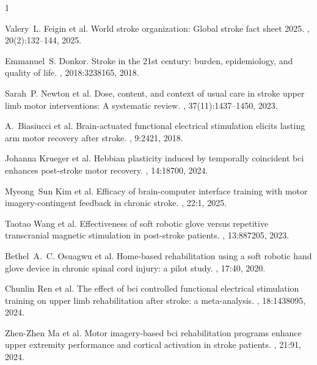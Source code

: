\documentclass[11pt,a4paper]{article}
\begin{document}
\begin{thebibliography}{1}
\footnotesize
\setlength{\itemsep}{0pt}
\setlength{\parsep}{0pt}
\setlength{\parskip}{0pt}
\setlength{\leftmargin}{0pt}
\addtolength{\leftmargin}{\labelwidth}
\addtolength{\leftmargin}{\labelsep}
\renewcommand{\refname}{References}

Valery~L. Feigin et al.
\newblock World stroke organization: Global stroke fact sheet 2025.
, 20(2):132--144, 2025.

Emmanuel~S. Donkor.
\newblock Stroke in the 21st century: burden, epidemiology, and quality of life.
, 2018:3238165, 2018.

Sarah~P. Newton et al.
\newblock Dose, content, and context of usual care in stroke upper limb motor interventions: A systematic review.
, 37(11):1437--1450, 2023.

A.~Biasiucci et al.
\newblock Brain-actuated functional electrical stimulation elicits lasting arm motor recovery after stroke.
, 9:2421, 2018.

Johanna Krueger et al.
\newblock Hebbian plasticity induced by temporally coincident bci enhances post-stroke motor recovery.
, 14:18700, 2024.

Myeong~Sun Kim et al.
\newblock Efficacy of brain-computer interface training with motor imagery-contingent feedback in chronic stroke.
, 22:1, 2025.

Taotao Wang et al.
\newblock Effectiveness of soft robotic glove versus repetitive transcranial magnetic stimulation in post-stroke patients.
, 13:887205, 2023.

Bethel~A.~C. Osuagwu et al.
\newblock Home-based rehabilitation using a soft robotic hand glove device in chronic spinal cord injury: a pilot study.
, 17:40, 2020.

Chunlin Ren et al.
\newblock The effect of bci controlled functional electrical stimulation training on upper limb rehabilitation after stroke: a meta-analysis.
, 18:1438095, 2024.

Zhen-Zhen Ma et al.
\newblock Motor imagery-based bci rehabilitation programs enhance upper extremity performance and cortical activation in stroke patients.
, 21:91, 2024.


\end{thebibliography}
\end{document}

